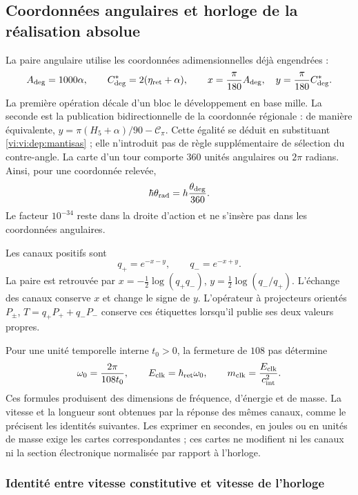 \subsection{Coordonnées angulaires et horloge de la réalisation absolue}
\label{vi:vi:dep:reloj}

La paire angulaire utilise les coordonnées adimensionnelles déjà engendrées :
\begin{equation}
 A_{\deg}=1000\alpha,\qquad
 C^*_{\deg}=2(\eta_{\rm ret}+\alpha),\qquad
 x=\frac{\pi}{180}A_{\deg},\quad
 y=\frac{\pi}{180}C^*_{\deg}.
 \label{vi:vi:dep:angulos}
\end{equation}
La première opération décale d'un bloc le développement en base mille.
La seconde est la publication bidirectionnelle de la coordonnée régionale :
de manière équivalente,
\(y=\pi(H_5+\alpha)/90-\mathcal C_\pi\).
Cette égalité se déduit en substituant \eqref{vi:vi:dep:mantisas} ; elle
n'introduit pas de règle supplémentaire de sélection du contre-angle.
La carte d'un tour comporte \(360\) unités angulaires ou \(2\pi\)
radians. Ainsi, pour une coordonnée relevée,
\[
 \hbar\theta_{\rm rad}
 =h\frac{\theta_{\deg}}{360}.
\]
Le facteur \(10^{-34}\) reste dans la droite d’action et ne
s’insère pas dans les coordonnées angulaires.

Les canaux positifs sont
\[
 q_+=e^{-x-y},\qquad q_-=e^{-x+y}.
\]
La paire est retrouvée par
\(x=-\tfrac12\log(q_+q_-)\),
\(y=\tfrac12\log(q_-/q_+)\). L'échange des canaux conserve
\(x\) et change le signe de \(y\). L'opérateur à projecteurs
orientés \(P_\pm\),
\(T=q_+P_++q_-P_-\) conserve ces étiquettes lorsqu'il publie ses deux
valeurs propres.

Pour une unité temporelle interne \(t_0>0\), la fermeture de \(108\)
pas détermine
\begin{equation}
 \omega_0=\frac{2\pi}{108t_0},\qquad
 E_{\rm clk}=\hbar_{\rm ret}\omega_0,
 \qquad m_{\rm clk}=\frac{E_{\rm clk}}{c_{\rm int}^{2}}.
 \label{vi:vi:dep:reloj-absoluto}
\end{equation}
Ces formules produisent des dimensions de fréquence, d'énergie et de masse.
La vitesse et la longueur sont obtenues par la réponse des
mêmes canaux, comme le précisent les identités suivantes. Les exprimer
en secondes, en joules ou en unités de masse exige les cartes
correspondantes ; ces cartes ne modifient ni les canaux ni la section
électronique normalisée par rapport à l'horloge.

\subsubsection{Identité entre vitesse constitutive et vitesse de l’horloge}

